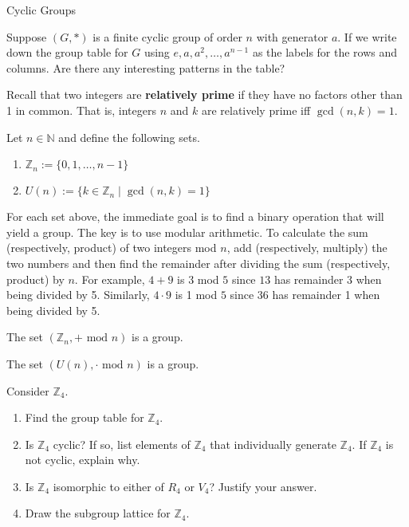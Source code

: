 \begin{section}{Cyclic Groups}
\begin{exercise}
Suppose $(G,*)$ is a finite cyclic group of order $n$ with generator $a$.  If we write down the group table for $G$ using $e, a, a^2, \ldots, a^{n-1}$ as the labels for the rows and columns.  Are there any interesting patterns in the table?
\end{exercise}

Recall that two integers are \textbf{relatively prime} if they have no factors other than 1 in common.  That is, integers $n$ and $k$ are relatively prime iff $\gcd(n,k)=1$.

\begin{definition}
Let $n\in\mathbb{N}$ and define the following sets.
\begin{enumerate}
\item $\mathbb{Z}_n:=\{0,1,\ldots,n-1\}$
\item $U(n):=\{k\in\mathbb{Z}_n\mid \gcd(n,k)=1\}$
\end{enumerate}
\end{definition}

For each set above, the immediate goal is to find a binary operation that will yield a group.  The key is to use modular arithmetic.  To calculate the sum (respectively, product) of two integers mod $n$, add (respectively, multiply) the two numbers and then find the remainder after dividing the sum (respectively, product) by $n$. For example, $4+9$ is $3$ mod $5$ since $13$ has remainder 3 when being divided by 5.  Similarly, $4\cdot 9$ is 1 mod $5$ since 36 has remainder 1 when being divided by 5.

\begin{theorem}
The set $(\mathbb{Z}_n,+\text{ mod }n)$ is a group.  
\end{theorem}

\begin{theorem}
The set $(U(n),\cdot\text{ mod }n)$ is a group.  
\end{theorem}

\begin{exercise}
Consider $\mathbb{Z}_4$.
\begin{enumerate}[label=\rm{(\alph*)}]
\item Find the group table for $\mathbb{Z}_4$.
\item Is $\mathbb{Z}_4$ cyclic? If so, list elements of $\mathbb{Z}_4$ that individually generate $\mathbb{Z}_4$.  If $\mathbb{Z}_4$ is not cyclic, explain why.
\item Is $\mathbb{Z}_4$ isomorphic to either of $R_4$ or $V_4$? Justify your answer.
\item Draw the subgroup lattice for $\mathbb{Z}_4$.
\end{enumerate}
\end{exercise}


\end{section}
